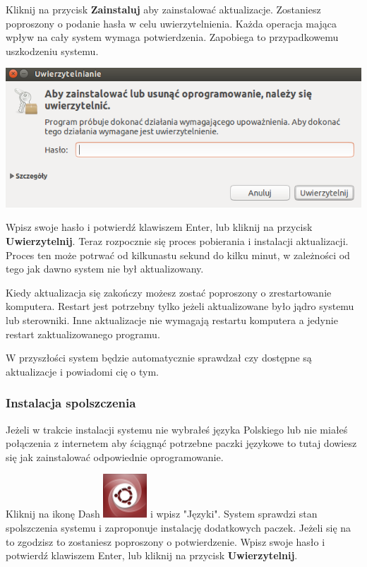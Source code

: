 Kliknij na przycisk \textbf{Zainstaluj} aby zainstalować aktualizacje. Zostaniesz poproszony o podanie hasła w celu uwierzytelnienia. Każda operacja mająca wpływ na cały system wymaga potwierdzenia. Zapobiega to przypadkowemu uszkodzeniu systemu.
\begin{center}
	\includegraphics{images/unity_uwierzytelnienie.png}
\end{center}

Wpisz swoje hasło i potwierdź klawiszem Enter, lub kliknij na przycisk \textbf{Uwierzytelnij}. Teraz rozpocznie się proces pobierania i instalacji aktualizacji. Proces ten może potrwać od kilkunastu sekund do kilku minut, w zależności od tego jak dawno system nie był aktualizowany.

Kiedy aktualizacja się zakończy możesz zostać poproszony o zrestartowanie komputera. Restart jest potrzebny tylko jeżeli aktualizowane było jądro systemu lub sterowniki. Inne aktualizacje nie wymagają restartu komputera a jedynie restart zaktualizowanego programu.

W przyszłości system będzie automatycznie sprawdzał czy dostępne są aktualizacje i powiadomi cię o tym.
\clearpage
\subsubsection{Instalacja spolszczenia}
Jeżeli w trakcie instalacji systemu nie wybrałeś języka Polskiego lub nie miałeś połączenia z internetem aby ściągnąć potrzebne paczki językowe to tutaj dowiesz się jak zainstalować odpowiednie oprogramowanie.

Kliknij na ikonę Dash \includegraphics[scale=0.35]{images/ikony_dash.png} i wpisz "Języki". System sprawdzi stan spolszczenia systemu i zaproponuje instalację dodatkowych paczek. Jeżeli się na to zgodzisz to zostaniesz poproszony o potwierdzenie. Wpisz swoje hasło i potwierdź klawiszem Enter, lub kliknij na przycisk \textbf{Uwierzytelnij}.

